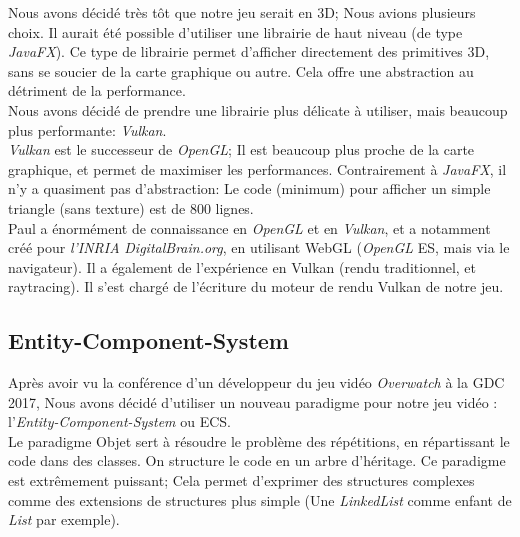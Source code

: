 \documentclass[french]{article}
\begin{document}
Nous avons décidé très tôt que notre jeu serait en 3D; Nous avions plusieurs choix. Il aurait été possible d'utiliser une librairie de haut niveau (de type \textit{JavaFX}). Ce type de librairie permet d'afficher directement des primitives 3D, sans se soucier de la carte graphique ou autre. Cela offre une abstraction au détriment de la performance.\\

Nous avons décidé de prendre une librairie plus délicate à utiliser, mais beaucoup plus performante: \textit{Vulkan}.\\

\textit{Vulkan} est le successeur de \textit{OpenGL}; Il est beaucoup plus proche de la carte graphique, et permet de maximiser les performances. Contrairement à \textit{JavaFX}, il n'y a quasiment pas d'abstraction: Le code (minimum) pour afficher un simple triangle (sans texture) est de 800 lignes.\\

Paul a énormément de connaissance en \textit{OpenGL} et en \textit{Vulkan}, et a notamment créé pour \textit{l'INRIA} \textit{DigitalBrain.org}, en utilisant WebGL (\textit{OpenGL} ES, mais via le navigateur). Il a également de l'expérience en Vulkan (rendu traditionnel, et raytracing). Il s'est chargé de l'écriture du moteur de rendu Vulkan de notre jeu. 

\subsection{Entity-Component-System}

Après avoir vu la conférence d'un développeur du jeu vidéo \textit{Overwatch} à la GDC 2017, Nous avons décidé d'utiliser un nouveau paradigme pour notre jeu vidéo : l'\textit{Entity-Component-System} ou ECS.\\

Le paradigme Objet sert à résoudre le problème des répétitions, en répartissant le code dans des classes. On structure le code en un arbre d'héritage. Ce paradigme est extrêmement puissant; Cela permet d'exprimer des structures complexes comme des extensions de structures plus simple (Une \textit{LinkedList} comme enfant de \textit{List} par exemple).\\
\end{document}
